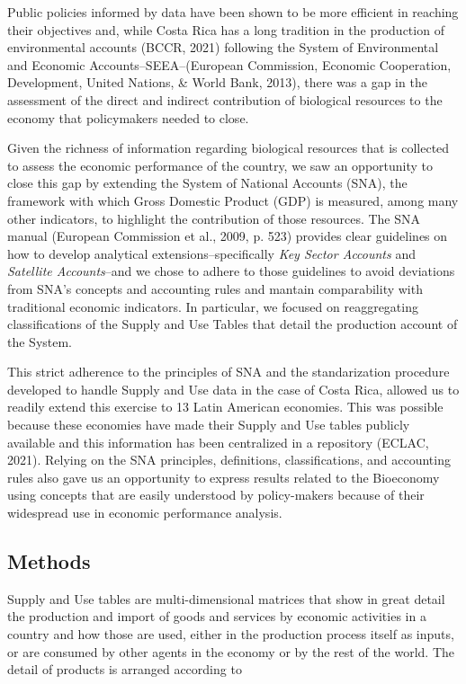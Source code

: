 \documentclass[
  letterpaper,
  DIV=11,
  numbers=noendperiod]{scrartcl}
\begin{document}
Public policies informed by data have been shown to be more efficient in
reaching their objectives and, while Costa Rica has a long tradition in
the production of environmental accounts (BCCR, 2021) following the
System of Environmental and Economic Accounts--SEEA--(European
Commission, Economic Cooperation, Development, United Nations, \& World
Bank, 2013), there was a gap in the assessment of the direct and
indirect contribution of biological resources to the economy that
policymakers needed to close.

Given the richness of information regarding biological resources that is
collected to assess the economic performance of the country, we saw an
opportunity to close this gap by extending the System of National
Accounts (SNA), the framework with which Gross Domestic Product (GDP) is
measured, among many other indicators, to highlight the contribution of
those resources. The SNA manual (European Commission et al., 2009, p.
523) provides clear guidelines on how to develop analytical
extensions--specifically \emph{Key Sector Accounts} and \emph{Satellite
Accounts}--and we chose to adhere to those guidelines to avoid
deviations from SNA's concepts and accounting rules and mantain
comparability with traditional economic indicators. In particular, we
focused on reaggregating classifications of the Supply and Use Tables
that detail the production account of the System.

This strict adherence to the principles of SNA and the standarization
procedure developed to handle Supply and Use data in the case of Costa
Rica, allowed us to readily extend this exercise to 13 Latin American
economies. This was possible because these economies have made their
Supply and Use tables publicly available and this information has been
centralized in a repository (ECLAC, 2021). Relying on the SNA
principles, definitions, classifications, and accounting rules also gave
us an opportunity to express results related to the Bioeconomy using
concepts that are easily understood by policy-makers because of their
widespread use in economic performance analysis.

\subsection{Methods}\label{methods}

Supply and Use tables are multi-dimensional matrices that show in great
detail the production and import of goods and services by economic
activities in a country and how those are used, either in the production
process itself as inputs, or are consumed by other agents in the economy
or by the rest of the world. The detail of products is arranged
according to
\end{document}

